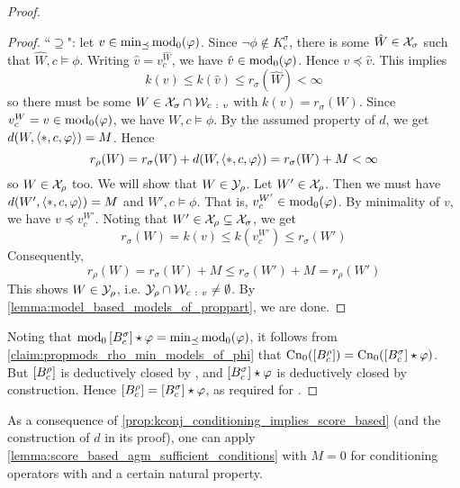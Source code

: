 \begin{proof}
\begin{proof}
            ``$\supseteq$": let $v \in \min_{\preceq}{\operatorname{mod}_0(\varphi)}$. Since
            $\neg\phi \notin K^\sigma_c$, there is some $\hat{W} \in \mathcal{X}_\sigma$
            such that $\hat{W}, c \models \phi$. Writing $\hat{v} =
            v^{\hat{W}}_c$, we have $\hat{v} \in \operatorname{mod}_0(\varphi)$. Hence $v
            \preceq \hat{v}$. This implies
            \[
                k(v) \le k(\hat{v}) \le r_\sigma(\hat{W}) < \infty
            \]
            so there must be some $W \in \mathcal{X}_\sigma \cap \mathcal{W}_{c\ :\  v}$ with
            $k(v) = r_\sigma(W)$. Since $v^W_c = v \in \operatorname{mod}_0(\varphi)$, we
            have $W, c \models \phi$. By the assumed property of $d$, we get
            $d(W, \langle {\ast, c, \varphi} \rangle) = M$. Hence
            \[
                r_\rho(W)
                = r_\sigma(W) + d(W, \langle {\ast, c, \varphi} \rangle)
                = r_\sigma(W) + M
                < \infty
            \]
            so $W \in \mathcal{X}_\rho$ too. We will show that $W \in \mathcal{Y}_\rho$. Let $W'
            \in \mathcal{X}_\rho$. Then we must have $d(W', \langle {\ast, c, \varphi} \rangle) = M$
            and $W', c \models \phi$. That is, $v^{W'}_c \in \operatorname{mod}_0(\varphi)$.
            By minimality of $v$, we have $v \preceq v^{W'}_c$. Noting that $W'
            \in \mathcal{X}_\rho \subseteq \mathcal{X}_\sigma$, we get
            \[
                r_\sigma(W)
                = k(v)
                \le k(v^{W'}_c)
                \le r_\sigma(W')
            \]
            Consequently,
            \[
                r_\rho(W)
                = r_\sigma(W) + M
                \le r_\sigma(W') + M
                = r_\rho(W')
            \]
            This shows $W \in \mathcal{Y}_\rho$, i.e. $\mathcal{Y}_\rho \cap \mathcal{W}_{c\ :\  v} \ne
            \emptyset$. By \cref{lemma:model_based_models_of_proppart}, we are
            done.

        \end{proof}

    Noting that $\operatorname{mod}_0\left[{B^\sigma_c}\right] \star \varphi =
    \min_{\preceq}{\operatorname{mod}_0(\varphi)}$, it follows from
    \cref{claim:propmods_rho_min_models_of_phi} that
    $\operatorname{Cn}_0(\left[{B^\rho_c}\right]) = \operatorname{Cn}_0(\left[{B^\sigma_c}\right] \star \varphi)$.
    But $\left[{B^\rho_c}\right]$ is deductively closed by \closure{}, and
    $\left[{B^\sigma_c}\right]
    \star \varphi$ is deductively closed by construction. Hence
    $\left[{B^\rho_c}\right] = \left[{B^\sigma_c}\right] \star \varphi$, as required for
    \agm{}.

\end{proof}

As a consequence of \cref{prop:kconj_conditioning_implies_score_based} (and the
construction of $d$ in its proof), one can apply
\cref{lemma:score_based_agm_sufficient_conditions} with $M = 0$ for
conditioning operators with \kconj{} and a certain natural property.

